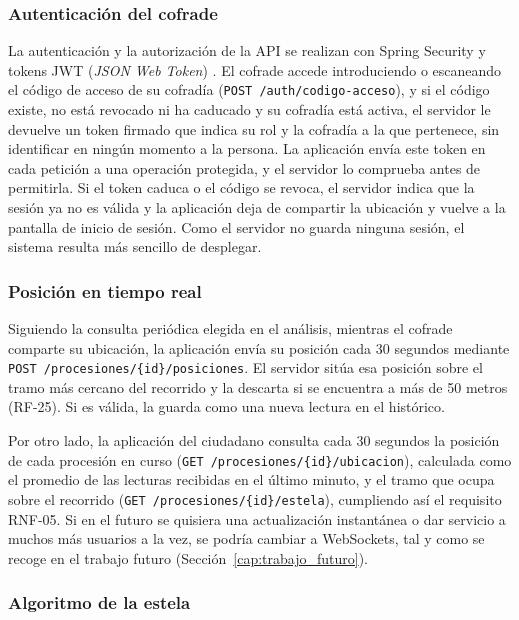 \subsubsection{Autenticación del cofrade}

La autenticación y la autorización de la API se realizan con Spring Security \cite{springsecurity} y tokens JWT (\emph{JSON Web Token}) \cite{jwt}. El cofrade accede introduciendo o escaneando el código de acceso de su cofradía (\texttt{POST /auth/codigo-acceso}), y si el código existe, no está revocado ni ha caducado y su cofradía está activa, el servidor le devuelve un token firmado que indica su rol y la cofradía a la que pertenece, sin identificar en ningún momento a la persona. La aplicación envía este token en cada petición a una operación protegida, y el servidor lo comprueba antes de permitirla. Si el token caduca o el código se revoca, el servidor indica que la sesión ya no es válida y la aplicación deja de compartir la ubicación y vuelve a la pantalla de inicio de sesión. Como el servidor no guarda ninguna sesión, el sistema resulta más sencillo de desplegar.

\subsubsection{Posición en tiempo real}

Siguiendo la consulta periódica elegida en el análisis, mientras el cofrade comparte su ubicación, la aplicación envía su posición cada 30 segundos mediante \texttt{POST /procesiones/\{id\}/posiciones}. El servidor sitúa esa posición sobre el tramo más cercano del recorrido y la descarta si se encuentra a más de 50 metros (RF-25). Si es válida, la guarda como una nueva lectura en el histórico.

Por otro lado, la aplicación del ciudadano consulta cada 30 segundos la posición de cada procesión en curso (\texttt{GET /procesiones/\{id\}/ubicacion}), calculada como el promedio de las lecturas recibidas en el último minuto, y el tramo que ocupa sobre el recorrido (\texttt{GET /procesiones/\{id\}/estela}), cumpliendo así el requisito RNF-05. Si en el futuro se quisiera una actualización instantánea o dar servicio a muchos más usuarios a la vez, se podría cambiar a WebSockets, tal y como se recoge en el trabajo futuro (Sección~\ref{cap:trabajo_futuro}).

\subsubsection{Algoritmo de la estela}

